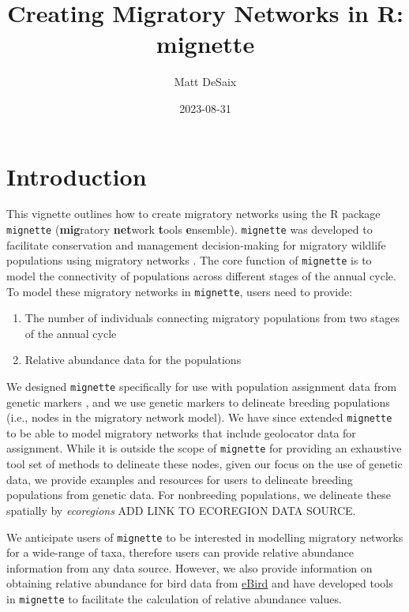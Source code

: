 \documentclass[
]{book}
\title{Creating Migratory Networks in R: mignette}
\author{Matt DeSaix}
\date{2023-08-31}
\providecommand{\tightlist}{%
  \setlength{\itemsep}{0pt}\setlength{\parskip}{0pt}}
\begin{document}
\maketitle

{
\setcounter{tocdepth}{1}
\tableofcontents
}
\hypertarget{introduction}{%
\chapter{Introduction}\label{introduction}}

This vignette outlines how to create migratory networks using the R package \texttt{mignette} (\textbf{mig}ratory \textbf{net}work \textbf{t}ools \textbf{e}nsemble). \texttt{mignette} was developed to facilitate conservation and management decision-making for migratory wildlife populations using migratory networks \citep{ruegg2020genoscape, taylor2010population}. The core function of \texttt{mignette} is to model the connectivity of populations across different stages of the annual cycle. To model these migratory networks in \texttt{mignette}, users need to provide:

\begin{enumerate}
\def\labelenumi{\arabic{enumi}.}
\tightlist
\item
  The number of individuals connecting migratory populations from two stages of the annual cycle
\item
  Relative abundance data for the populations
\end{enumerate}

We designed \texttt{mignette} specifically for use with population assignment data from genetic markers \citep{ruegg2014mapping, desaix2019population}, and we use genetic markers to delineate breeding populations (i.e., nodes in the migratory network model). We have since extended \texttt{mignette} to be able to model migratory networks that include geolocator data for assignment. While it is outside the scope of \texttt{mignette} for providing an exhaustive tool set of methods to delineate these nodes, given our focus on the use of genetic data, we provide examples and resources for users to delineate breeding populations from genetic data. For nonbreeding populations, we delineate these spatially by \emph{ecoregions} ADD LINK TO ECOREGION DATA SOURCE.

We anticipate users of \texttt{mignette} to be interested in modelling migratory networks for a wide-range of taxa, therefore users can provide relative abundance information from any data source. However, we also provide information on obtaining relative abundance for bird data from \href{https://ebird.org/science/status-and-trends}{eBird} and have developed tools in \texttt{mignette} to facilitate the calculation of relative abundance values.
\end{document}
